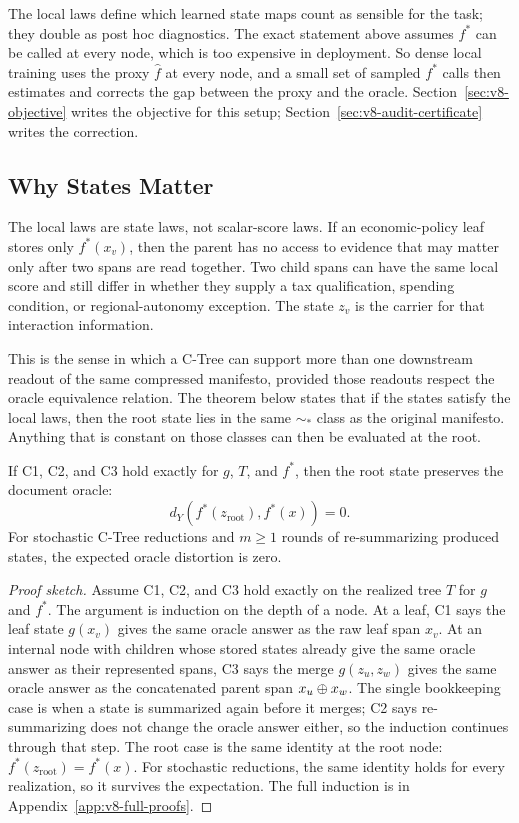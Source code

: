 The local laws define which learned state maps count as sensible for
the task; they double as post hoc diagnostics. The exact statement
above assumes \(f^\ast\) can be called at every node, which is too
expensive in deployment. So dense local training uses the proxy
\(\widehat f\) at every node, and a small set of sampled \(f^\ast\)
calls then estimates and corrects the gap between the proxy and the
oracle. Section~\ref{sec:v8-objective} writes the objective for this
setup; Section~\ref{sec:v8-audit-certificate} writes the correction.

\subsection{Why States Matter}

The local laws are state laws, not scalar-score laws. If an economic-policy
leaf stores only \(f^\ast(x_v)\), then the parent has no access to evidence
that may matter only after two spans are read together. Two child spans can
have the same local score and still differ in whether they supply a tax
qualification, spending condition, or regional-autonomy exception. The state
\(z_v\) is the carrier for that interaction information.

This is the sense in which a C-Tree can support more than one downstream
readout of the same compressed manifesto, provided those readouts
respect the oracle equivalence relation. The theorem below states that
if the states satisfy the local laws, then the root state lies in the
same \(\sim_\ast\) class as the original manifesto. Anything that is
constant on those classes can then be evaluated at the root.

\begin{theorem}\label{thm:v8-root-preservation}
If C1, C2, and C3 hold exactly for \(g\), \(T\), and \(f^\ast\), then the root
state preserves the document oracle:
\[
  d_Y\!\left(f^\ast(z_{\mathrm{root}}),f^\ast(x)\right)=0 .
\]
For stochastic C-Tree reductions and \(m\ge 1\) rounds of
re-summarizing produced states, the expected oracle distortion is
zero.
\end{theorem}

\begin{proof}[Proof sketch]
Assume C1, C2, and C3 hold exactly on the realized tree \(T\) for
\(g\) and \(f^\ast\). The argument is induction on the depth of a
node. At a leaf, C1 says the leaf state \(g(x_v)\) gives the same
oracle answer as the raw leaf span \(x_v\). At an internal node with
children whose stored states already give the same oracle answer as
their represented spans, C3 says the merge \(g(z_u,z_w)\) gives the
same oracle answer as the concatenated parent span \(x_u\oplus x_w\).
The single bookkeeping case is when a state is summarized again
before it merges; C2 says re-summarizing does not change the oracle
answer either, so the induction continues through that step. The
root case is the same identity at the root node:
\(f^\ast(z_{\mathrm{root}})=f^\ast(x)\). For stochastic reductions,
the same identity holds for every realization, so it survives the
expectation. The full induction is in
Appendix~\ref{app:v8-full-proofs}.
\end{proof}

